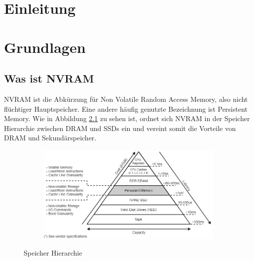 \documentclass{class/thesis}
\begin{document}
  \begin{thesis}


%    
%    
%    
%    
%    
%    
%    
%    
%    
%    
%    

	\chapter{Einleitung}
	
	
	

	\chapter{Grundlagen}
	
	\section{Was ist NVRAM}
	NVRAM ist die Abkürzung für \glqq{}Non Volatile Random Access Memory\grqq{}, also nicht flüchtiger Hauptspeicher. Eine andere häufig genutzte Bezeichnung ist \glqq{}Persistent Memory\grqq{}.
	Wie in Abbildung \ref{bildSpeicherHierarchie} zu sehen ist, ordnet sich NVRAM in der Speicher Hierarchie zwischen DRAM und SSDs ein und vereint somit die Vorteile von DRAM und Sekundärspeicher.
	
	\begin{figure}[h]
		\centering
		\begin{subfigure}[b]{1.0\textwidth}
			\includegraphics[width=1.0\linewidth]{img/pmem_storage_pyramid}
		\end{subfigure}
		\caption{Speicher Hierarchie \cite{PMEM.IO}}
		\label{bildSpeicherHierarchie}
	\end{figure}
	

\end{thesis}
\end{document}
